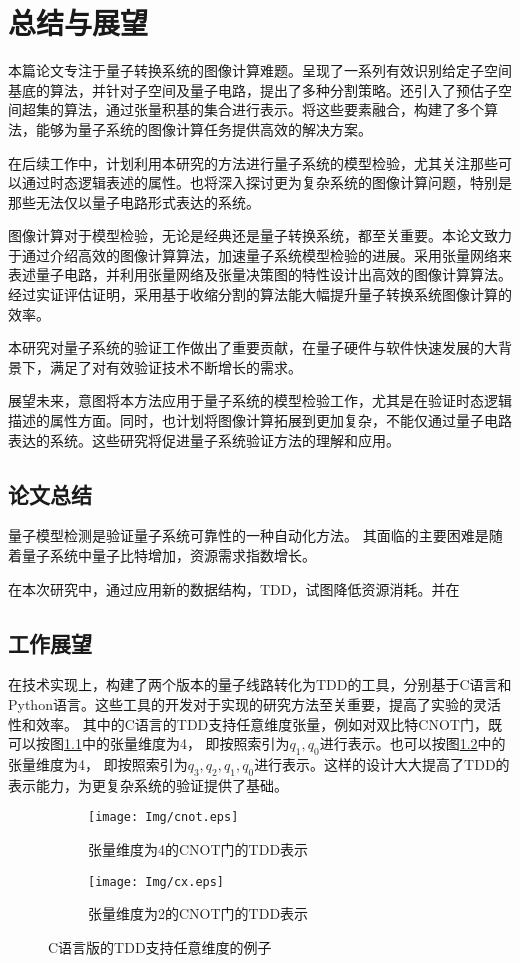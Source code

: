 \chapter{总结与展望}
本篇论文专注于量子转换系统的图像计算难题。呈现了一系列有效识别给定子空间基底的算法，并针对子空间及量子电路，提出了多种分割策略。还引入了预估子空间超集的算法，通过张量积基的集合进行表示。将这些要素融合，构建了多个算法，能够为量子系统的图像计算任务提供高效的解决方案。

在后续工作中，计划利用本研究的方法进行量子系统的模型检验，尤其关注那些可以通过时态逻辑表述的属性。也将深入探讨更为复杂系统的图像计算问题，特别是那些无法仅以量子电路形式表达的系统。

图像计算对于模型检验，无论是经典还是量子转换系统，都至关重要。本论文致力于通过介绍高效的图像计算算法，加速量子系统模型检验的进展。采用张量网络来表述量子电路，并利用张量网络及张量决策图的特性设计出高效的图像计算算法。经过实证评估证明，采用基于收缩分割的算法能大幅提升量子转换系统图像计算的效率。

本研究对量子系统的验证工作做出了重要贡献，在量子硬件与软件快速发展的大背景下，满足了对有效验证技术不断增长的需求。

展望未来，意图将本方法应用于量子系统的模型检验工作，尤其是在验证时态逻辑描述的属性方面。同时，也计划将图像计算拓展到更加复杂，不能仅通过量子电路表达的系统。这些研究将促进量子系统验证方法的理解和应用。
\section{论文总结}
量子模型检测是验证量子系统可靠性的一种自动化方法。
其面临的主要困难是随着量子系统中量子比特增加，资源需求指数增长。

在本次研究中，通过应用新的数据结构，TDD，试图降低资源消耗。并在
\section{工作展望}
在技术实现上，构建了两个版本的量子线路转化为TDD的工具，分别基于C语言和Python语言。这些工具的开发对于实现的研究方法至关重要，提高了实验的灵活性和效率。
其中的C语言的TDD支持任意维度张量，例如对双比特CNOT门，既可以按图\ref{fig:cnot-4}中的张量维度为4，
即按照索引为$q_1,q_0$进行表示。也可以按图\ref{fig:cnot-2}中的张量维度为4，
即按照索引为$q_3,q_2,q_1,q_0$进行表示。这样的设计大大提高了TDD的表示能力，为更复杂系统的验证提供了基础。
\begin{figure}[!htbp]
    \centering
    \begin{subfigure}[b]{.4\textwidth}
        \centering
        \texttt{[image: Img/cnot.eps]}
        \caption{张量维度为4的CNOT门的TDD表示}
        \label{fig:cnot-4}
    \end{subfigure}
    \begin{subfigure}[b]{.4\textwidth}
        \centering
        \texttt{[image: Img/cx.eps]}
        \caption{张量维度为2的CNOT门的TDD表示}
        \label{fig:cnot-2}
    \end{subfigure}
    \caption{C语言版的TDD支持任意维度的例子}
    \label{fig-cnot}
\end{figure}
